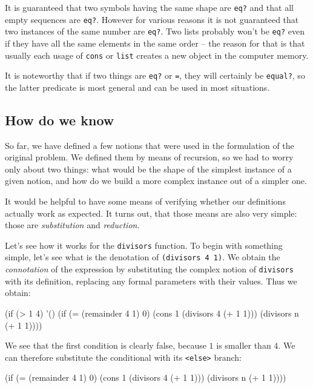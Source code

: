 It is guaranteed that two symbols having the same shape are
\texttt{eq?} and that all empty sequences are \texttt{eq?}. However
for various reasons it is not guaranteed that two instances of
the same number are \texttt{eq?}.
Two lists probably won't be \texttt{eq?} even if they have
all the same elements in the same order -- the reason for that
is that usually each usage of \texttt{cons} or \texttt{list}
creates a new object in the computer memory.

It is noteworthy that if two things are \texttt{eq?} or \texttt{=},
they will certainly be \texttt{equal?}, so the latter predicate is
most general and can be used in most situations.

\subsection{How do we know}

So far, we have defined a few notions that were used in the
formulation of the original problem. We defined them by means
of recursion, so we had to worry only about two things:
what would be the shape of the simplest instance of a given
notion, and how do we build a more complex instance out of
a simpler one.

It would be helpful to have some means of verifying whether
our definitions actually work as expected. It turns out, that
those means are also very simple: those are \textit{substitution}
and \textit{reduction}.

Let's see how it works for the \texttt{divisors} function.
To begin with something simple, let's see what is the denotation
of \texttt{(divisors 4 1)}. We obtain the \textit{connotation}
of the expression by substituting the complex notion of
\texttt{divisors} with its definition, replacing any formal
parameters with their values. Thus we obtain:

\begin{Snippet}
(if (> 1 4)
  '()
  (if (= (remainder 4 1) 0)
    (cons 1 (divisors 4 (+ 1 1)))
    (divisors n (+ 1 1))))
\end{Snippet}

We see that the first condition is clearly false, because $1$
is smaller than $4$. We can therefore substitute the
conditional with its \texttt{<else>} branch:

\begin{Snippet}
(if (= (remainder 4 1) 0)
  (cons 1 (divisors 4 (+ 1 1)))
  (divisors n (+ 1 1))))
\end{Snippet}

